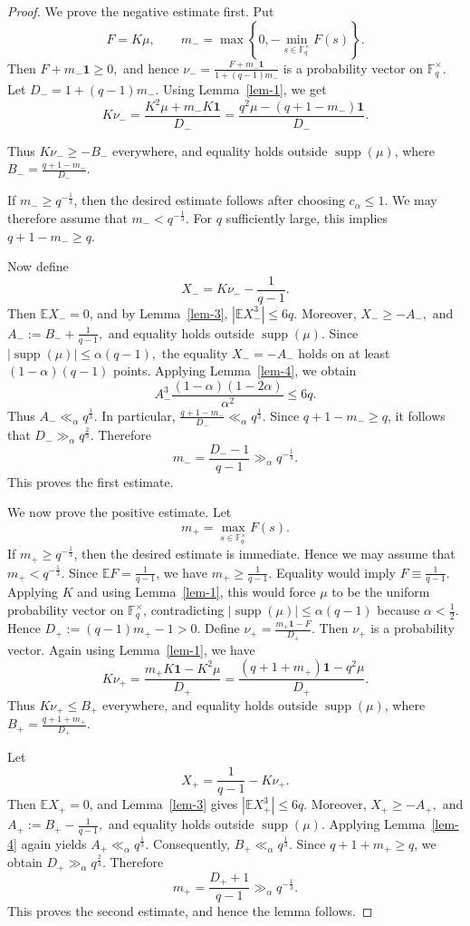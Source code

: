 \documentclass[11pt]{article}
\newcommand{\1}{\mathbf{1}}
\begin{document}
\begin{proof}
	We prove the negative estimate first. Put
	\[
	F=K\mu,
	\qquad
	m_-=\max\left\{0,-\min_{s\in\mathbb{F}_q^\times}F(s)\right\}.
	\]
	Then $F+m_-\mathbf{1}\ge0,$
	and hence $\nu_-=
	\frac{F+m_-\mathbf{1}}{1+(q-1)m_-}$
	is a probability vector on \(\mathbb{F}_q^\times\). Let $D_-=1+(q-1)m_-.$
	Using Lemma~\ref{lem-1}, we get
	\[		K\nu_-
	=
	\frac{K^2\mu+m_-K\mathbf{1}}{D_-}  
	=
	\frac{q^2\mu-(q+1-m_-)\mathbf{1}}{D_-}.\]

	Thus \(K\nu_-\ge -B_-\) everywhere, and equality holds outside \(\operatorname{supp}(\mu)\), where $B_-=\frac{q+1-m_-}{D_-}.$
	
	If \(m_-\ge q^{-\frac{1}{3}}\), then the desired estimate follows after choosing \(c_\alpha\le1\). We may therefore assume that $m_-<q^{-\frac{1}{3}}.$
	For \(q\) sufficiently large, this implies \(q+1-m_-\ge q\).
	
	Now define
	\[
	X_-=K\nu_- -\frac{1}{q-1}.
	\]
	Then \(\mathbb{E}X_-=0\), and by Lemma~\ref{lem-3}, $|\mathbb{E}X_-^3|\le 6q.$
	Moreover, $X_-\ge -A_-,$ and $A_-:=B_-+\frac{1}{q-1},$
	and equality holds outside \(\operatorname{supp}(\mu)\). Since $|\operatorname{supp}(\mu)|\le \alpha(q-1),$
	the equality \(X_-=-A_-\) holds on at least \((1-\alpha)(q-1)\) points. Applying Lemma~\ref{lem-4}, we obtain
	\[
	A_-^3
	\frac{(1-\alpha)(1-2\alpha)}{\alpha^2}
	\le
	6q.
	\]
	Thus $A_-\ll_\alpha q^{\frac{1}{3}}.$
	In particular, $\frac{q+1-m_-}{D_-}\ll_\alpha q^{\frac{1}{3}}.$
	Since \(q+1-m_-\ge q\), it follows that $D_-\gg_\alpha q^{\frac{2}{3}}.$
	Therefore
	\[
	m_-=\frac{D_- -1}{q-1}\gg_\alpha q^{-\frac{1}{3}}.
	\]
	This proves the first estimate.
	
	We now prove the positive estimate. Let
	\[
	m_+=\max_{s\in\mathbb{F}_q^\times}F(s).
	\]
	If \(m_+\ge q^{-\frac{1}{3}}\), then the desired estimate is immediate. Hence we may assume that $m_+<q^{-\frac{1}{3}}.$
	Since \(\mathbb{E}F=\frac{1}{q-1}\), we have \(m_+\ge\frac{1}{q-1}\). Equality would imply \(F\equiv\frac{1}{q-1}\). Applying \(K\) and using Lemma~\ref{lem-1}, this would force \(\mu\) to be the uniform probability vector on \(\mathbb{F}_q^\times\), contradicting $|\operatorname{supp}(\mu)|\le\alpha(q-1)$
	because \(\alpha<\frac{1}{2}\). Hence $D_+:=(q-1)m_+-1>0.$
	Define $\nu_+=\frac{m_+\mathbf{1}-F}{D_+}.$
	Then \(\nu_+\) is a probability vector. Again using Lemma~\ref{lem-1}, we have
	\[K\nu_+
	=
	\frac{m_+K\mathbf{1}-K^2\mu}{D_+}  
	=
	\frac{(q+1+m_+)\mathbf{1}-q^2\mu}{D_+}.\]
	Thus \(K\nu_+\le B_+\) everywhere, and equality holds outside \(\operatorname{supp}(\mu)\), where $B_+=\frac{q+1+m_+}{D_+}.$
	
	Let
	\[
	X_+=\frac{1}{q-1}-K\nu_+.
	\]
	Then \(\mathbb{E}X_+=0\), and Lemma~\ref{lem-3} gives $|\mathbb{E}X_+^3|\le 6q.$
	Moreover, $	X_+\ge -A_+,$ and $A_+:=B_+-\frac{1}{q-1},$
	and equality holds outside \(\operatorname{supp}(\mu)\). Applying Lemma~\ref{lem-4} again yields $A_+\ll_\alpha q^{\frac{1}{3}}.$
	Consequently, $B_+\ll_\alpha q^{\frac{1}{3}}.$
	Since \(q+1+m_+\ge q\), we obtain $D_+\gg_\alpha q^{\frac{2}{3}}.$
	Therefore
	\[
	m_+=\frac{D_+ +1}{q-1}\gg_\alpha q^{-\frac{1}{3}}.
	\]
	This proves the second estimate, and hence the lemma follows.
\end{proof}
\end{document}
